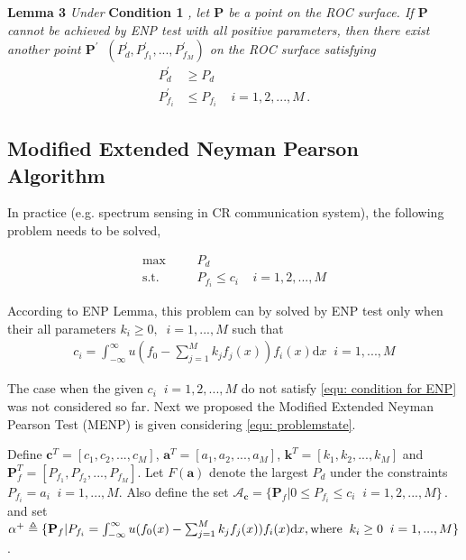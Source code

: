 \documentclass[12pt,journal,a4paper,twoside,onecolumn,draft]{IEEEtran}
\begin{document}
\begin{spacing}{2.5}
\noindent \textbf{Lemma 3}
\textit{
\noindent
Under}
\textbf{Condition 1}
\textit{, let $\mathbf{P}$ be a point on the ROC surface. If  $\mathbf{P}$ cannot be achieved by ENP test with all positive parameters, then there  exist another point $\mathbf{P}^\prime\;\; (P_d^\prime, P_{f_1}^\prime, ..., P_{f_M}^\prime)$ on the ROC surface satisfying
}
\begin{equation}
  \label{equ: lemma 3 equation}
  \begin{split}
    P_d^\prime &\geq P_d\\
    P_{f_i}^\prime &\leq P_{f_i}\;\;\;\;i = 1, 2, ..., M\,.
  \end{split}
\end{equation}

\subsection{Modified Extended Neyman Pearson Algorithm}


In practice (e.g. spectrum sensing in CR communication system), the following problem needs to be solved,

      \begin{equation}
      \label{equ: problemstate}
      \begin{split}
      \max\;\;\;\;\;\;&P_d\\
      \text{s.t.}\;\;\;\;\;\;&P_{f_i} \leq c_i\;\;\;\;i = 1, 2, ..., M
      \end{split}
      \end{equation}

According to ENP Lemma, this problem can by solved by ENP test only when their all parameters $k_i \geq 0, \;\;i=1, ..., M$ such that 
\begin{equation}
\label{equ: condition for ENP}
\begin{split}
c_i = \int_{-\infty}^{\infty}u(f_0 - \sum_{j=1}^{M}k_jf_j(x))f_i(x)\mathrm{d}x \;\;i = 1, ..., M
\end{split}
\end{equation}

The case when the given $c_i\;\;i = 1, 2, ..., M$ do not satisfy \eqref{equ: condition for ENP} was not considered so far. Next we proposed the Modified Extended Neyman Pearson Test (MENP) is given considering \eqref{equ: problemstate}.

\def \JUDGEMENT{u(f_0(x) - \sum_{j=1}^{M}k_j f_j(x))}

Define $\mathbf{c}^T = [c_1, c_2, ..., c_M]$, $\mathbf{a}^T=[a_1, a_2, ..., a_M]$, $\mathbf{k}^T = [k_1, k_2, ..., k_M]$ and  $\mathbf{P}_f^T = [P_{f_1}, P_{f_2}, ..., P_{f_M}]$. Let
$F(\mathbf{a})$ denote the largest $P_d$ under the constraints $P_{f_i} = a_i\;\;i = 1, ..., M$.
Also define the set $\mathcal{A}_\mathbf{c} = \{
  \mathbf{P}_f | 0 \leq P_{f_i} \leq c_i
  \;\;i=1, 2, ..., M\}\,.
$ and set $\alpha^+ \triangleq \{\mathbf{P}_f | P_{f_i} = \int_{-\infty}^{\infty} \JUDGEMENT f_i(x) \mathrm{d}x, \text{where\;\;} k_i \geq 0 \;\;i=1, ..., M\}$.


\end{spacing}
\end{document}
